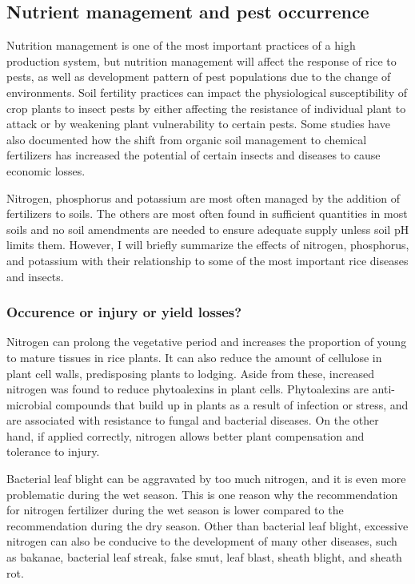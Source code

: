 \subsection*{Nutrient management and pest occurrence}

Nutrition management is one of the most important practices of a high production system, but nutrition management will affect the response of rice to pests, as well as development pattern of pest populations due to the change of environments. Soil fertility practices can impact the physiological susceptibility of crop plants to insect pests by either affecting the resistance of individual plant to attack or by weakening plant vulnerability to certain pests. Some studies have also documented how the shift from organic soil management to chemical fertilizers has increased the potential of certain insects and diseases to cause economic losses.

Nitrogen, phosphorus and potassium are most often managed by the addition of fertilizers to soils. The others are most often found in sufficient quantities in most soils and no soil amendments are needed to ensure adequate supply unless soil pH limits them. However, I will briefly summarize the effects of nitrogen, phosphorus, and potassium with their relationship to some of the most important rice diseases and insects.

\subsubsection{Occurence or injury or yield losses?}

Nitrogen can prolong the vegetative period and increases the proportion of young to mature tissues in rice plants. It can also reduce the amount of cellulose in plant cell walls, predisposing plants to lodging. Aside from these, increased nitrogen was found to reduce phytoalexins in plant cells. Phytoalexins are anti-microbial compounds that build up in plants as a result of infection or stress, and are associated with resistance to fungal and bacterial diseases. On the other hand, if applied correctly, nitrogen allows better plant compensation and tolerance to injury.

Bacterial leaf blight can be aggravated by too much nitrogen, and it is even more problematic during the wet season. This is one reason why the recommendation for nitrogen fertilizer during the wet season is lower compared to the recommendation during the dry season. Other than bacterial leaf blight, excessive nitrogen can also be conducive to the development of many other diseases, such as bakanae, bacterial leaf streak, false smut, leaf blast, sheath blight, and sheath rot.

